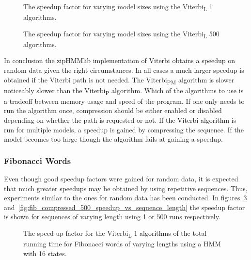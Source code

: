 \begin{figure}
  \centering
  
  \caption{The speedup factor for varying model sizes using the Viterbi\textsubscript{L} 1
    algorithms.}
  \label{fig:speedup_vs_N}
\end{figure}

\begin{figure}
  \centering
  
  \caption{The speedup factor for varying model sizes using the Viterbi\textsubscript{L} 500
    algorithms.}
  \label{fig:speedup_vs_N2}
\end{figure}

In conclusion the zipHMMlib implementation of Viterbi obtains a speedup on
random data given the right circumstances. In all cases a much larger speedup
is obtained if the Viterbi path is not needed. The Viterbi\textsubscript{PM}
algorithm is slower noticeably slower than the Viterbi\textsubscript{P} algorithm. Which
of the algorithms to use is a tradeoff between memory usage and speed of the
program. If one only needs to run the algorithm once, compression should be
either enabled or disabled depending on whether the path is requested or
not. If the Viterbi algorithm is run for multiple models, a speedup is gained
by compressing the sequence. If the model becomes too large though the
algorithm fails at gaining a speedup.

\subsubsection{Fibonacci Words}

Even though good speedup factors were gained for random data, it is expected
that much greater speedups may be obtained by using repetitive
sequences. Thus, experiments similar to the ones for random data has been
conducted. In figures~\ref{fig:fib_compressed_1_speedup_vs_sequence_length}
and~\ref{fig:fib_compressed_500_speedup_vs_sequence_length} the speedup factor
is shown for sequences of varying length using 1 or 500 runs respectively.

\begin{figure}
  \centering
  
  \caption{The speed up factor for the Viterbi\textsubscript{L} 1 algorithms of the total
    running time for Fibonacci words of varying
    lengths using a HMM with 16 states.}
  \label{fig:fib_compressed_1_speedup_vs_sequence_length}
\end{figure}

